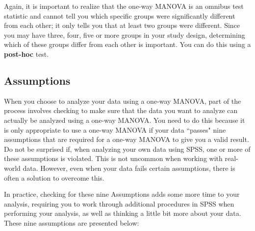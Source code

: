 \documentclass[a4paper,12pt]{article}
\begin{document}
Again, it is important to realize that the one-way MANOVA is an omnibus test statistic and cannot tell you which specific groups were significantly different from each other; it only tells you that at least two groups were different. Since you may have three, four, five or more groups in your study design, determining which of these groups differ from each other is important. You can do this using a \textbf{post-hoc} test.


\subsection{Assumptions}
When you choose to analyze your data using a one-way MANOVA, part of the process involves checking to make sure that the data you want to analyze can actually be analyzed using a one-way MANOVA. You need to do this because it is only appropriate to use a one-way MANOVA if your data ``passes" nine assumptions that are required for a one-way MANOVA to give you a valid result. Do not be surprised if, when analyzing your own data using SPSS, one or more of these assumptions is violated. This is not uncommon when working with real-world data. However, even when your data fails certain assumptions, there is often a solution to overcome this.

In practice, checking for these nine Assumptions adds some more time to your analysis, requiring you to work through additional procedures in SPSS when performing your analysis, as well as thinking a little bit more about your data. These nine assumptions are presented below:
\end{document}
